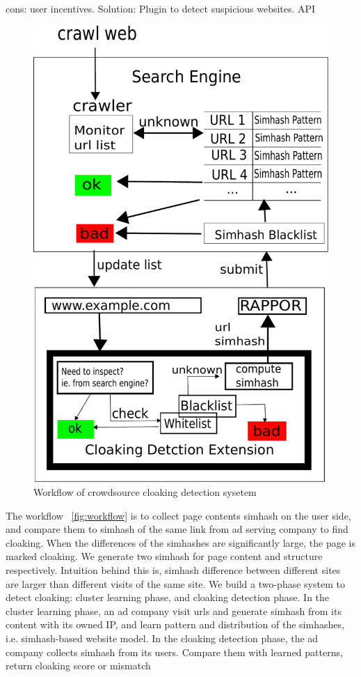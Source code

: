 cons: user incentives. 
Solution: Plugin to detect suspicious websites. API


\begin{figure}[t]
  \centering
  \includegraphics[width=.5\textwidth]{fig/workflow}
  \caption{Workflow of crowdsource cloaking detection sysetem}
  \label{fig:workflow}
\end{figure}


The workflow ~\autoref{fig:workflow} is to collect page contents simhash on the user side, and compare
them to simhash of the same link from ad serving company to find cloaking. When
the differences of the simhashes are significantly large, the page is marked
cloaking. We generate two simhash for page content and structure respectively.
Intuition behind this is, simhash difference between different sites are larger
than different visits of the same site. We build a two-phase system to detect
cloaking: cluster learning phase, and cloaking detection phase. In the cluster
learning phase, an ad company visit urls and generate simhash from its content
with its owned IP, and learn pattern and distribution of the simhashes, i.e.
simhash-based website model. In the cloaking detection phase, the ad company
collects simhash from its users. Compare them with learned patterns, return
cloaking score or mismatch


